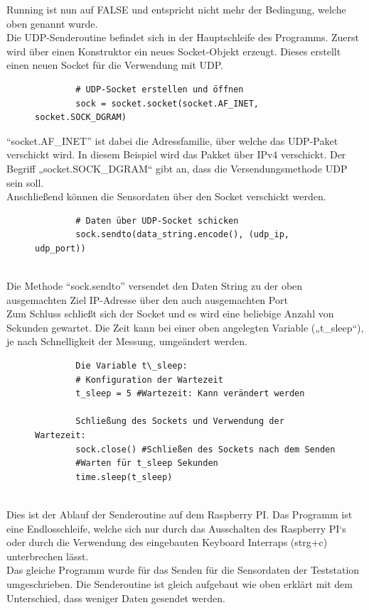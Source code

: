 Running ist nun auf FALSE und entspricht nicht mehr der Bedingung, welche oben genannt wurde.\\
Die UDP-Senderoutine befindet sich in der Hauptschleife des Programms. Zuerst wird über einen Konstruktor ein neues Socket-Objekt erzeugt. Dieses erstellt einen neuen Socket für die Verwendung mit UDP.
\vspace{3mm}
\begin{figure}[H]
	\centering
	\begin{verbatim}
		# UDP-Socket erstellen und öffnen 
		sock = socket.socket(socket.AF_INET, socket.SOCK_DGRAM) 
	\end{verbatim}
\end{figure}
“socket.AF\_INET” ist dabei die Adressfamilie, über welche das UDP-Paket verschickt wird. In diesem Beispiel wird das Pakket über IPv4 verschickt. Der Begriff „socket.SOCK\_DGRAM“ gibt an, dass die Versendungsmethode UDP sein soll.\\
\vspace{3mm}
Anschließend können die Sensordaten über den Socket verschickt werden. 
\vspace{3mm}
\begin{figure}[H]
	\centering
	\begin{verbatim}
		# Daten über UDP-Socket schicken 
		sock.sendto(data_string.encode(), (udp_ip, udp_port))
		
	\end{verbatim}
\end{figure}
Die Methode “sock.sendto” versendet den Daten String zu der oben ausgemachten Ziel IP-Adresse über den auch ausgemachten Port \\

Zum Schluss schließt sich der Socket und es wird eine beliebige Anzahl von Sekunden gewartet. Die Zeit kann bei einer oben angelegten Variable („t\_sleep“), je nach Schnelligkeit der Messung, umgeändert werden. \\
\vspace{3mm}
\begin{figure}[H]
	\centering
	\begin{verbatim}
		Die Variable t\_sleep:
		# Konfiguration der Wartezeit 
		t_sleep = 5 #Wartezeit: Kann verändert werden 
		
		Schließung des Sockets und Verwendung der Wartezeit:
		sock.close() #Schließen des Sockets nach dem Senden
		#Warten für t_sleep Sekunden
		time.sleep(t_sleep)
		
	\end{verbatim}
\end{figure}
\newpage
Dies ist der Ablauf der Senderoutine auf dem Raspberry PI. Das Programm ist eine Endlosschleife, welche sich nur durch das Ausschalten des Raspberry PI‘s oder durch die Verwendung des eingebauten Keyboard Interraps (strg+c) unterbrechen lässt.\\
\vspace{3mm}
Das gleiche Programm wurde für das Senden für die Sensordaten der Teststation umgeschrieben. Die Senderoutine ist gleich aufgebaut wie oben erklärt mit dem Unterschied, dass weniger Daten gesendet werden.

